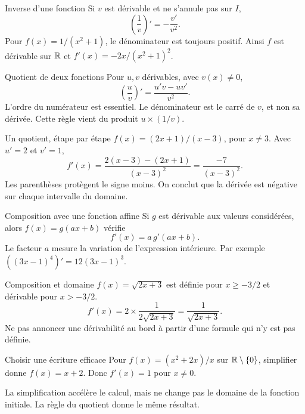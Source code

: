 \documentclass[aspectratio=169,12pt]{beamer}
\begin{document}
\renewcommand{\slidekind}{COMPRENDRE}
\begin{frame}[t,fragile]{Inverse d’une fonction}
Si $v$ est dérivable et ne s’annule pas sur $I$,\[\left(\frac1v\right)\prime=-\frac{v\prime}{v^2}.\] Pour $f(x)=1/(x^2+1)$, le dénominateur est toujours positif. Ainsi $f$ est dérivable sur $\mathbb{R}$ et $f\prime(x)=-2x/(x^2+1)^2$.
\end{frame}
\renewcommand{\slidekind}{COMPRENDRE}
\begin{frame}[t,fragile]{Quotient de deux fonctions}
Pour $u,v$ dérivables, avec $v(x)\ne0$,\[\left(\frac uv\right)\prime=\frac{u\prime v-uv\prime}{v^2}.\] L’ordre du numérateur est essentiel. Le dénominateur est le carré de $v$, et non sa dérivée. Cette règle vient du produit $u\times(1/v)$.
\end{frame}
\renewcommand{\slidekind}{MÉTHODE \& EXEMPLE}
\begin{frame}[t,fragile]{Un quotient, étape par étape}
$f(x)=(2x+1)/(x-3)$, pour $x\ne3$. Avec $u\prime=2$ et $v\prime=1$,\[f\prime(x)=\frac{2(x-3)-(2x+1)}{(x-3)^2}=\frac{-7}{(x-3)^2}.\] Les parenthèses protègent le signe moins. On conclut que la dérivée est négative sur chaque intervalle du domaine.
\end{frame}
\renewcommand{\slidekind}{COMPRENDRE}
\begin{frame}[t,fragile]{Composition avec une fonction affine}
Si $g$ est dérivable aux valeurs considérées, alors $f(x)=g(ax+b)$ vérifie\[f\prime(x)=a\,g\prime(ax+b).\] Le facteur $a$ mesure la variation de l’expression intérieure. Par exemple $((3x-1)^4)\prime=12(3x-1)^3$.
\end{frame}
\renewcommand{\slidekind}{COMPRENDRE}
\begin{frame}[t,fragile]{Composition et domaine}
$f(x)=\sqrt{2x+3}$ est définie pour $x\ge-3/2$ et dérivable pour $x>-3/2$.\[f\prime(x)=2\times\frac1{2\sqrt{2x+3}}=\frac1{\sqrt{2x+3}}.\] Ne pas annoncer une dérivabilité au bord à partir d’une formule qui n’y est pas définie.
\end{frame}
\renewcommand{\slidekind}{MÉTHODE \& EXEMPLE}
\begin{frame}[t,fragile]{Choisir une écriture efficace}
Pour $f(x)=(x^2+2x)/x$ sur $\mathbb{R}\setminus\{0\}$, simplifier donne $f(x)=x+2$. Donc $f\prime(x)=1$ pour $x\ne0$.\medskip\par La simplification accélère le calcul, mais ne change pas le domaine de la fonction initiale. La règle du quotient donne le même résultat.
\end{frame}
\renewcommand{\slidekind}{À RETENIR}
\end{document}
